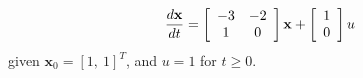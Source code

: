 
\[
\frac{{d{\bf{x}}}}{{dt}} = \left[ {\begin{array}{*{20}c}
   { - 3} & { - 2}  \\
   1 & 0  \\
\end{array}} \right]{\bf{x}} + \left[ {\begin{array}{*{20}c}
   1  \\
   0  \\
\end{array}} \right]u
\]
given $\mathbf{x}_0=[1,\ 1]^T$, and $u = 1$ for $t\ge 0$.
\endinput
